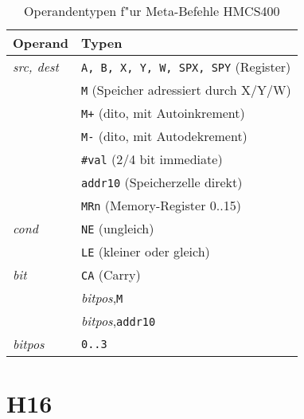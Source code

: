 \documentclass[12pt,a4paper,twoside]{report}
\newcommand{\tty}[1]{{\tt #1}}
\begin{document}
\begin{table*}
\begin{center}\begin{tabular}{|l|l|}
\hline
Operand                 & Typen \\
\hline
{\em src, dest}         & \tty{A, B, X, Y, W, SPX, SPY} (Register) \\
                        & \tty{M} (Speicher adressiert durch X/Y/W) \\
                        & \tty{M+} (dito, mit Autoinkrement) \\
                        & \tty{M-} (dito, mit Autodekrement) \\
                        & \tty{\#val} (2/4 bit immediate) \\
                        & \tty{addr10} (Speicherzelle direkt) \\
                        & \tty{MRn} (Memory-Register 0..15) \\
{\em cond}              & \tty{NE} (ungleich) \\
                        & \tty{LE} (kleiner oder gleich) \\
{\em bit}               & \tty{CA} (Carry) \\
                        & {\em bitpos},\tty{M} \\
                        & {\em bitpos},\tty{addr10} \\
{\em bitpos}            & \tty{0..3} \\
\hline
\end{tabular}\end{center}
\caption{Operandentypen f"ur Meta-Befehle HMCS400}
\label{TabHMCS400MetaOps}
\end{table*}


\section{H16}
\end{document}
